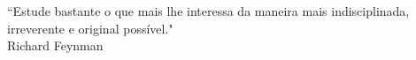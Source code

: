 \begin{epigrafe}
    \vspace*{\fill}
	\begin{flushright}
	    \parbox{0.6\linewidth}{
		“Estude bastante o que mais lhe interessa da maneira mais indisciplinada, irreverente e original possível." \\
		
		Richard Feynman
	}
	\end{flushright}
	\vspace{2cm}
\end{epigrafe}